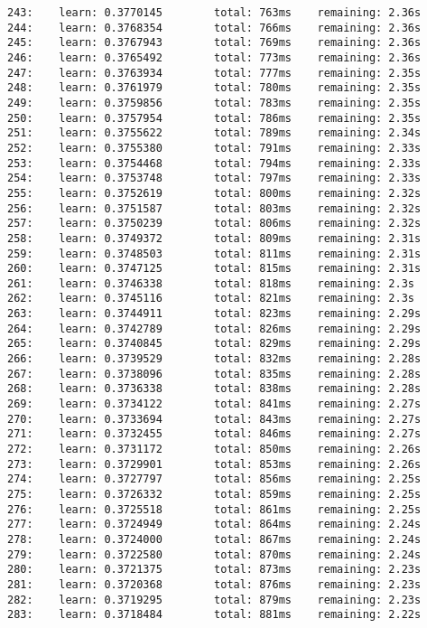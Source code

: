 \documentclass[11pt]{article}
\begin{document}
\begin{Verbatim}[commandchars=\\\{\}]
243:    learn: 0.3770145        total: 763ms    remaining: 2.36s
244:    learn: 0.3768354        total: 766ms    remaining: 2.36s
245:    learn: 0.3767943        total: 769ms    remaining: 2.36s
246:    learn: 0.3765492        total: 773ms    remaining: 2.36s
247:    learn: 0.3763934        total: 777ms    remaining: 2.35s
248:    learn: 0.3761979        total: 780ms    remaining: 2.35s
249:    learn: 0.3759856        total: 783ms    remaining: 2.35s
250:    learn: 0.3757954        total: 786ms    remaining: 2.35s
251:    learn: 0.3755622        total: 789ms    remaining: 2.34s
252:    learn: 0.3755380        total: 791ms    remaining: 2.33s
253:    learn: 0.3754468        total: 794ms    remaining: 2.33s
254:    learn: 0.3753748        total: 797ms    remaining: 2.33s
255:    learn: 0.3752619        total: 800ms    remaining: 2.32s
256:    learn: 0.3751587        total: 803ms    remaining: 2.32s
257:    learn: 0.3750239        total: 806ms    remaining: 2.32s
258:    learn: 0.3749372        total: 809ms    remaining: 2.31s
259:    learn: 0.3748503        total: 811ms    remaining: 2.31s
260:    learn: 0.3747125        total: 815ms    remaining: 2.31s
261:    learn: 0.3746338        total: 818ms    remaining: 2.3s
262:    learn: 0.3745116        total: 821ms    remaining: 2.3s
263:    learn: 0.3744911        total: 823ms    remaining: 2.29s
264:    learn: 0.3742789        total: 826ms    remaining: 2.29s
265:    learn: 0.3740845        total: 829ms    remaining: 2.29s
266:    learn: 0.3739529        total: 832ms    remaining: 2.28s
267:    learn: 0.3738096        total: 835ms    remaining: 2.28s
268:    learn: 0.3736338        total: 838ms    remaining: 2.28s
269:    learn: 0.3734122        total: 841ms    remaining: 2.27s
270:    learn: 0.3733694        total: 843ms    remaining: 2.27s
271:    learn: 0.3732455        total: 846ms    remaining: 2.27s
272:    learn: 0.3731172        total: 850ms    remaining: 2.26s
273:    learn: 0.3729901        total: 853ms    remaining: 2.26s
274:    learn: 0.3727797        total: 856ms    remaining: 2.25s
275:    learn: 0.3726332        total: 859ms    remaining: 2.25s
276:    learn: 0.3725518        total: 861ms    remaining: 2.25s
277:    learn: 0.3724949        total: 864ms    remaining: 2.24s
278:    learn: 0.3724000        total: 867ms    remaining: 2.24s
279:    learn: 0.3722580        total: 870ms    remaining: 2.24s
280:    learn: 0.3721375        total: 873ms    remaining: 2.23s
281:    learn: 0.3720368        total: 876ms    remaining: 2.23s
282:    learn: 0.3719295        total: 879ms    remaining: 2.23s
283:    learn: 0.3718484        total: 881ms    remaining: 2.22s

\end{Verbatim}
\end{document}
